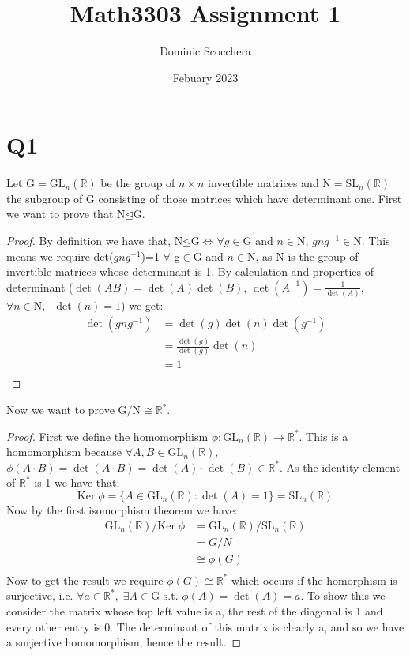 \documentclass{article}
\title{Math3303 Assignment 1}
\author{Dominic Scocchera}
\date{Febuary 2023}
\begin{document}
\maketitle
\section*{Q1}
Let $\text{G} = \text{GL}_n(\mathbb{R})$ be the group of $n \times n$ invertible matrices and $\text{N} = \text{SL}_n(\mathbb{R})$ the subgroup of G consisting of those matrices which have determinant one. First we want to prove that N$\unlhd$G.
\begin{proof}
By definition we have that, N$\unlhd$G$\iff\forall g\in$G and $n\in$N, $gng^{-1}\in$N. This means we require det($gng^{-1}$)=1 $\forall$ g$\in$G and $n\in$N, as N is the group of invertible matrices whose determinant is 1. By calculation and properties of determinant ($\det(AB)=\det(A)\det(B)$, $\det(A^{-1})=\frac{1}{\det(A)}$, $\forall n\in\text{N},\;\;\det(n)=1$) we get:
\begin{align*}
    \det(gng^{-1})&=\det(g)\det(n)\det(g^{-1})\\
    &=\frac{\det(g)}{\det(g)}\det(n)\\
    &=1\\
\end{align*}
\end{proof}
\noindent Now we want to prove $\text{G}/\text{N}\cong\mathbb{R}^*$.
\begin{proof}
First we define the homomorphism $\phi:\text{GL}_n(\mathbb{R})\rightarrow\mathbb{R}^*$. This is a homomorphism because $\forall A,B\in\text{GL}_n(\mathbb{R})$, $\phi(A\cdot B)=\det(A\cdot B)=\det(A)\cdot\det(B)\in\mathbb{R}^*$. As the identity element of $\mathbb{R}^*$ is 1 we have that:
$$\text{Ker}\;\phi=\{A\in\text{GL}_n(\mathbb{R}):\det(A)=1\}=\text{SL}_n(\mathbb{R})$$
Now by the first isomorphism theorem we have:
\begin{align*}
\text{GL}_n(\mathbb{R})/\text{Ker}\;\phi&=\text{GL}_n(\mathbb{R})/\text{SL}_n(\mathbb{R})\\
&=G/N\\
&\cong\phi(G)\\
\end{align*}
Now to get the result we require $\phi(G)\cong\mathbb{R}^*$ which occurs if the homorphism is surjective, i.e. $\forall a\in\mathbb{R}^*,\;\exists A\in \text{G } \text{s.t. } \phi(A)=\det(A)=a$. To show this we consider the matrix whose top left value is a, the rest of the diagonal is 1 and every other entry is 0. The determinant of this matrix is clearly a, and so we have a surjective homomorphism, hence the result.
\end{proof}
\end{document}
